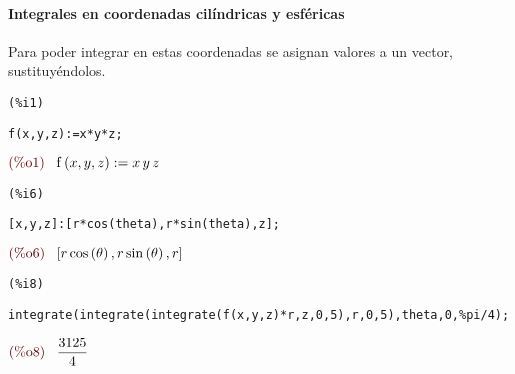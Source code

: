 \documentclass[12pt]{article}
\begin{document}
\paragraph{Integrales en coordenadas cilíndricas y esféricas} 
Para poder integrar en estas coordenadas se asignan valores a un vector, sustituyéndolos.

\noindent
\begin{minipage}[t]{8ex}{\color{red}\bf
\begin{verbatim}
(%i1) 
\end{verbatim}}
\end{minipage}
\begin{minipage}[t]{\textwidth}{\color{blue}
\begin{verbatim}
f(x,y,z):=x*y*z;
\end{verbatim}}
\end{minipage}
\begin{math}\displaystyle
\parbox{8ex}{\color{labelcolor}(\%o1) }
\mathrm{f}\left( x,y,z\right) :=x\,y\,z
\end{math}


\noindent
\begin{minipage}[t]{8ex}{\color{red}\bf
\begin{verbatim}
(%i6) 
\end{verbatim}}
\end{minipage}
\begin{minipage}[t]{\textwidth}{\color{blue}
\begin{verbatim}
[x,y,z]:[r*cos(theta),r*sin(theta),z];
\end{verbatim}}
\end{minipage}
\begin{math}\displaystyle
\parbox{8ex}{\color{labelcolor}(\%o6) }
[r\,\mathrm{cos}\left( \theta\right) ,r\,\mathrm{sin}\left( \theta\right) ,r]
\end{math}


\noindent
\begin{minipage}[t]{8ex}{\color{red}\bf
\begin{verbatim}
(%i8) 
\end{verbatim}}
\end{minipage}
\begin{minipage}[t]{\textwidth}{\color{blue}
\begin{verbatim}
integrate(integrate(integrate(f(x,y,z)*r,z,0,5),r,0,5),theta,0,%pi/4);
\end{verbatim}}
\end{minipage}
\begin{math}\displaystyle
\parbox{8ex}{\color{labelcolor}(\%o8) }
\frac{3125}{4}
\end{math}
\end{document}
